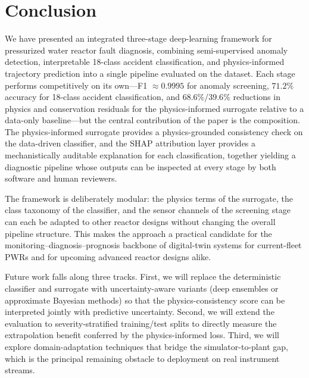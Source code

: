 \section{Conclusion}
\label{sec:conclusion}

We have presented an integrated three-stage deep-learning framework for pressurized water reactor fault diagnosis, combining semi-supervised anomaly detection, interpretable 18-class accident classification, and physics-informed trajectory prediction into a single pipeline evaluated on the \nppad{} dataset. Each stage performs competitively on its own---F1 $\approx 0.9995$ for anomaly screening, $71.2\%$ accuracy for 18-class accident classification, and $68.6\%$/$39.6\%$ reductions in physics and conservation residuals for the physics-informed surrogate relative to a data-only baseline---but the central contribution of the paper is the composition. The physics-informed surrogate provides a physics-grounded consistency check on the data-driven classifier, and the SHAP attribution layer provides a mechanistically auditable explanation for each classification, together yielding a diagnostic pipeline whose outputs can be inspected at every stage by both software and human reviewers.

The framework is deliberately modular: the physics terms of the surrogate, the class taxonomy of the classifier, and the sensor channels of the screening stage can each be adapted to other reactor designs without changing the overall pipeline structure. This makes the approach a practical candidate for the monitoring--diagnosis--prognosis backbone of digital-twin systems for current-fleet PWRs and for upcoming advanced reactor designs alike.

Future work falls along three tracks. First, we will replace the deterministic classifier and surrogate with uncertainty-aware variants (deep ensembles or approximate Bayesian methods) so that the physics-consistency score can be interpreted jointly with predictive uncertainty. Second, we will extend the evaluation to severity-stratified training/test splits to directly measure the extrapolation benefit conferred by the physics-informed loss. Third, we will explore domain-adaptation techniques that bridge the simulator-to-plant gap, which is the principal remaining obstacle to deployment on real instrument streams.
